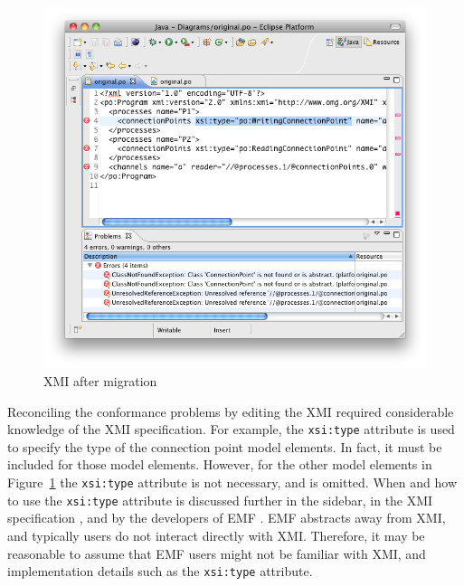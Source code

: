 \begin{figure}[htbp]
	\centering
	\includegraphics[width=12.75cm]{6.Evaluation/images/user_driven/po_migrated_xmi.png}
	\caption{XMI after migration}
	\label{fig:po_migrated_xmi}
\end{figure}

Reconciling the conformance problems by editing the XMI required considerable knowledge of the XMI specification. For example, the \texttt{xsi:type} attribute is used to specify the type of the connection point model elements. In fact, it must be included for those model elements. However, for the other model elements in Figure~\ref{fig:po_migrated_xmi} the \texttt{xsi:type} attribute is not necessary, and is omitted. When and how to use the \texttt{xsi:type} attribute is discussed further in the sidebar, in the XMI specification \cite{xmi}, and by the developers of EMF \cite{steinberg09emf}. EMF abstracts away from XMI, and typically users do not interact directly with XMI. Therefore, it may be reasonable to assume that EMF users might not be familiar with XMI, and implementation details such as the \texttt{xsi:type} attribute.

